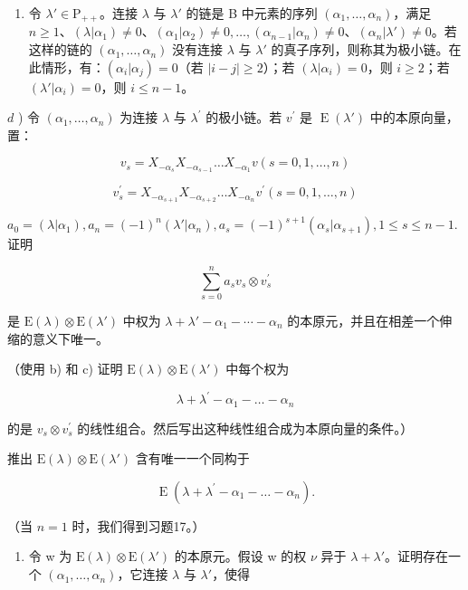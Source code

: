 \begin{enumerate}
\def\labelenumi{\alph{enumi})}
\setcounter{enumi}{2}
\tightlist
\item
  令 \(\lambda' \in \mathrm{P}_{++}\)。连接 \(\lambda\) 与 \(\lambda'\) 的链是 B 中元素的序列 \((\alpha_1, \ldots, \alpha_n)\)，满足 \(n \geq 1\)、\((\lambda|\alpha_1) \neq 0\)、\((\alpha_1|\alpha_2) \neq 0, \ldots, (\alpha_{n-1}|\alpha_n) \neq 0\)、\((\alpha_n|\lambda') \neq 0\)。若这样的链的 \((\alpha_1, \ldots, \alpha_n)\) 没有连接 \(\lambda\) 与 \(\lambda'\) 的真子序列，则称其为极小链。在此情形，有：\((\alpha_i|\alpha_j) = 0\)（若 \(|i - j| \geq 2\)）；若 \((\lambda|\alpha_i) = 0\)，则 \(i \geq 2\)；若 \((\lambda'|\alpha_i) = 0\)，则 \(i \leq n - 1\)。
\end{enumerate}

\(d\) ) 令 \((\alpha_{1},\ldots ,\alpha_{n})\) 为连接 \(\lambda\) 与 \(\lambda^{\prime}\) 的极小链。若 \(v^{\prime}\) 是 \(\operatorname {E}(\lambda ')\) 中的本原向量，置：

\[
v _ {s} = X _ {- \alpha_ {s}} X _ {- \alpha_ {s - 1}} \ldots X _ {- \alpha_ {1}} v (s = 0, 1, \ldots , n)
\]

\[
v _ {s} ^ {\prime} = X _ {- \alpha_ {s + 1}} X _ {- \alpha_ {s + 2}} \dots X _ {- \alpha_ {n}} v ^ {\prime} (s = 0, 1, \ldots , n)
\]

\(a_0 = (\lambda |\alpha_1), a_n = (-1)^n (\lambda '|\alpha_n), a_s = (-1)^{s + 1}(\alpha_s|\alpha_{s + 1}), 1 \leq s \leq n - 1.\) 证明

\[
\sum_ {s = 0} ^ {n} a _ {s} v _ {s} \otimes v _ {s} ^ {\prime}
\]

是 \(\mathrm{E}(\lambda)\otimes\mathrm{E}(\lambda')\) 中权为 \(\lambda+\lambda'-\alpha_{1}-\cdots-\alpha_{n}\) 的本原元，并且在相差一个伸缩的意义下唯一。

（使用 b) 和 c) 证明 \(\mathrm{E}(\lambda) \otimes \mathrm{E}(\lambda')\) 中每个权为

\[
\lambda + \lambda^ {\prime} - \alpha_ {1} - \dots - \alpha_ {n}
\]

的是 \(v_{s} \otimes v_{s}^{\prime}\) 的线性组合。然后写出这种线性组合成为本原向量的条件。）

推出 \(\mathrm{E}(\lambda) \otimes \mathrm{E}(\lambda')\) 含有唯一一个同构于

\[
\operatorname{E} \left(\lambda + \lambda^ {\prime} - \alpha_ {1} - \dots - \alpha_ {n}\right).
\]

（当 \(n = 1\) 时，我们得到习题17。）

\begin{enumerate}
\def\labelenumi{\alph{enumi})}
\setcounter{enumi}{4}
\tightlist
\item
  令 w 为 \(\mathrm{E}(\lambda)\otimes\mathrm{E}(\lambda')\) 的本原元。假设 w 的权 \(\nu\) 异于 \(\lambda+\lambda'\)。证明存在一个 \((\alpha_{1},\ldots,\alpha_{n})\)，它连接 \(\lambda\) 与 \(\lambda'\)，使得
\end{enumerate}

